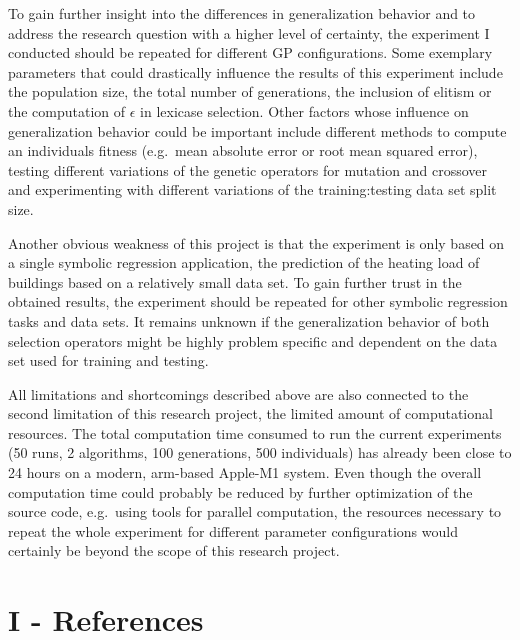\documentclass[
  12pt,
]{article}
\begin{document}
To gain further insight into the differences in generalization behavior
and to address the research question with a higher level of certainty,
the experiment I conducted should be repeated for different GP
configurations. Some exemplary parameters that could drastically
influence the results of this experiment include the population size,
the total number of generations, the inclusion of elitism or the
computation of \(\epsilon\) in lexicase selection. Other factors whose
influence on generalization behavior could be important include
different methods to compute an individuals fitness (e.g.~mean absolute
error or root mean squared error), testing different variations of the
genetic operators for mutation and crossover and experimenting with
different variations of the training:testing data set split size.

Another obvious weakness of this project is that the experiment is only
based on a single symbolic regression application, the prediction of the
heating load of buildings based on a relatively small data set. To gain
further trust in the obtained results, the experiment should be repeated
for other symbolic regression tasks and data sets. It remains unknown if
the generalization behavior of both selection operators might be highly
problem specific and dependent on the data set used for training and
testing.

All limitations and shortcomings described above are also connected to
the second limitation of this research project, the limited amount of
computational resources. The total computation time consumed to run the
current experiments (50 runs, 2 algorithms, 100 generations, 500
individuals) has already been close to 24 hours on a modern, arm-based
Apple-M1 system. Even though the overall computation time could probably
be reduced by further optimization of the source code, e.g.~using tools
for parallel computation, the resources necessary to repeat the whole
experiment for different parameter configurations would certainly be
beyond the scope of this research project.

\newpage

\hypertarget{I}{%
\section*{I - References}\label{I}}
\end{document}
